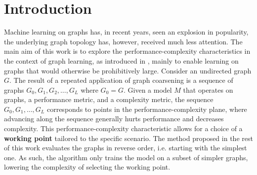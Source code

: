 \section{Introduction}\label{sec:introduction}
Machine learning on graphs has, in recent years, seen an explosion in popularity, the underlying graph topology has, however, received much less attention. The main aim of this work is to explore the performance-complexity characteristics in the context of graph learning, as introduced in \cite{prochazka_downstream_2022}, mainly to enable learning on graphs that would otherwise be prohibitively large. Consider an undirected graph \( G \). The result of a repeated application of graph coarsening is a sequence of graphs \( G_0, G_1, G_2, \dots, G_L \) where \( G_0 = G \). Given a model \( M \) that operates on graphs, a performance metric, and a complexity metric, the sequence \( G_0, G_1, \dots, G_L \) corresponds to points in the performance-complexity plane, where advancing along the sequence generally hurts performance and decreases complexity. This performance-complexity characteristic allows for a choice of a \textbf{working point} tailored to the specific scenario. The method proposed in the rest of this work evaluates the graphs in reverse order, i.e. starting with the simplest one. As such, the algorithm only trains the model on a subset of simpler graphs, lowering the complexity of selecting the working point.
